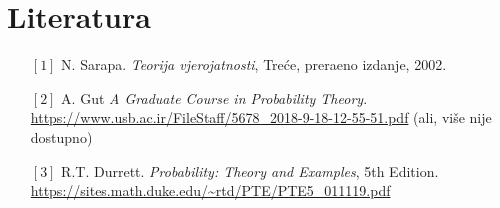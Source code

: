 \documentclass{article}
\begin{document}
\section{Literatura}
\footnotesize
\begin{enumerate}
    \item[\({[1]}\)] N. Sarapa.
    \textit{Teorija vjerojatnosti}, Treće, prera\dj{}eno izdanje, 2002. 
    \item[\({[2]}\)] A. Gut  
    \textit{A Graduate Course in Probability Theory}. \newline 
    \url{https://www.usb.ac.ir/FileStaff/5678_2018-9-18-12-55-51.pdf} (ali, više nije dostupno)

    \item[\({[3]}\)] R.T. Durrett.  
    \textit{Probability: Theory and Examples}, 5th Edition.\newline  
    \url{https://sites.math.duke.edu/~rtd/PTE/PTE5_011119.pdf}


\end{enumerate}
\end{document}
